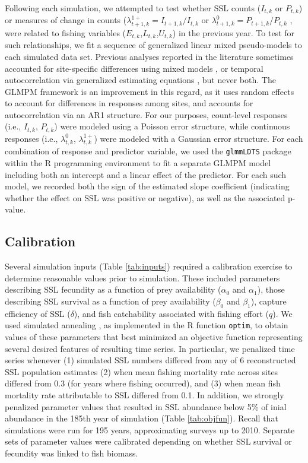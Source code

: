 \documentclass[nonumbib,leqno]{nrc1}
\begin{document}
Following each simulation, we attempted to test whether SSL counts ($I_{t,k}$ or $P_{t,k}$) or measures of change in counts ($\lambda_{t+1,k}^{1+}=I_{t+1,k}/I_{t,k}$ or $\lambda_{t+1,k}^{0}=P_{t+1,k}/P_{t,k}$ , were related to fishing variables ($E_{t,k}$,$L_{t,k}$,$U_{t,k}$) in the previous year.  To test for such relationships, we fit a sequence of generalized linear mixed pseudo-models \citep[GLMPM;][]{VerHoef2010} to each simulated data set.  Previous analyses reported in the literature sometimes accounted for site-specific differences using mixed models \citep{Hui:2011uq}, or temporal autocorrelation via generalized estimating equations \citep{Dillingham:2006fv,Trites:2010ly}, but never both.  The GLMPM framework is an improvement in this regard, as it uses random effects to account for differences in responses among sites, and accounts for autocorrelation via an AR1 structure.  For our purposes, count-level responses (i.e., $I_{t,k}$, $P_{t,k}$) were modeled using a Poisson error structure, while continuous responses (i.e., $\lambda_{t,k}^{0}$, $\lambda_{t,k}^{1+}$) were modeled with a Gaussian error structure.  For each combination of response and predictor variable, we used the \texttt{glmmLDTS} package \citep{VerHoef2010} within the R programming environment \citep{RTeam2012} to fit a separate GLMPM model including both an intercept and a linear effect of the predictor. For each such model, we recorded both the sign of the estimated slope coefficient (indicating whether the effect on SSL was positive or negative), as well as the associated p-value.

\subsection{Calibration}
\label{section:Calibration}

Several simulation inputs (Table \ref{tab:inputs}) required a calibration exercise to determine reasonable values prior to simulation.  These included parameters describing SSL fecundity as a function of prey availability ($\alpha_0$ and $\alpha_1$), those describing SSL survival as a function of prey availability ($\beta_0$ and $\beta_1$), capture efficiency of SSL ($\delta$), and fish catchability associated with fishing effort ($q$).  We used simulated annealing \citep{Belisle1992}, as implemented in the R function \texttt{optim}, to obtain values of these parameters that best minimized an objective function representing several desired features of resulting time series.  In particular, we penalized time series whenever (1) simulated SSL numbers differed from any of 6 reconstructed SSL population estimates \citep[see][Table 1]{Goodman2008} (2) when mean fishing mortality rate across sites differed from 0.3 (for years where fishing occurred), and (3) when mean fish mortality rate attributable to SSL differed from 0.1.  In addition, we strongly penalized parameter values that resulted in SSL abundance below 5\% of inial abundance in the 185th year of simulation (Table \ref{tab:objfun}). Recall that simulations were run for 195 years, approximating surveys up to 2010.  Separate sets of parameter values were calibrated depending on whether SSL survival or fecundity was linked to fish biomass.
\end{document}
